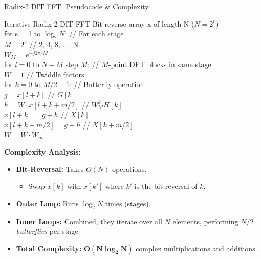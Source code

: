 \begin{frame}{Radix-2 DIT FFT: Pseudocode \& Complexity}
    \begin{algorithmbox}{Iterative Radix-2 DIT FFT}
        \ttfamily
        \scriptsize
        Bit-reverse array x of length N ($N = 2^v$) \\
        for s = 1 to $\log_2 N$: \quad \textcolor{AccentColor}{\textrm{// For each stage}} \\
        \hspace*{1em} $M = 2^s$ \quad \textcolor{AccentColor}{\textrm{// 2, 4, 8, ..., N}} \\
        \hspace*{1em} $W_M = e^{-j 2\pi / M}$ \\
        \hspace*{1em} for $l = 0$ to $N - M$ step $M$: \quad \textcolor{AccentColor}{\textrm{// $M$-point DFT blocks in same stage}} \\
        \hspace*{2em} $W = 1$ \quad \textcolor{AccentColor}{\textrm{// Twiddle factors}} \\
        \hspace*{2em} for $k = 0$ to $M/2 - 1$: \quad \textcolor{AccentColor}{\textrm{// Butterfly operation}} \\
        \hspace*{3em} $g = x[l + k]$ \quad \textcolor{AccentColor}{// $G[k]$} \\
        \hspace*{3em} $h = W \cdot x[l + k + m/2]$ \quad \textcolor{AccentColor}{// $W_M^k H[k]$} \\
        \hspace*{3em} $x[l + k] = g + h$ \quad \textcolor{AccentColor}{// $X[k]$} \\
        \hspace*{3em} $x[l + k + m/2] = g - h$ \quad \textcolor{AccentColor}{// $X[k+m/2]$} \\
        \hspace*{3em} $W = W \cdot W_m$
    \end{algorithmbox}
    \textbf{Complexity Analysis:}
    \begin{itemize}
        \item \textbf{Bit-Reversal:} Takes $O(N)$ operations.
              \begin{itemize}
                  \item Swap $x[k]$ with $x[k']$ where $k'$ is the bit-reversal of $k$.
              \end{itemize}
        \item \textbf{Outer Loop:} Runs $\log_2 N$ times (stages).
        \item \textbf{Inner Loops:} Combined, they iterate over all $N$ elements, performing $N/2$ \emph{butterflies} per stage.
        \item \textbf{Total Complexity:} $\mathbf{O(N \log_2 N)}$ complex multiplications and additions.
    \end{itemize}
\end{frame}


